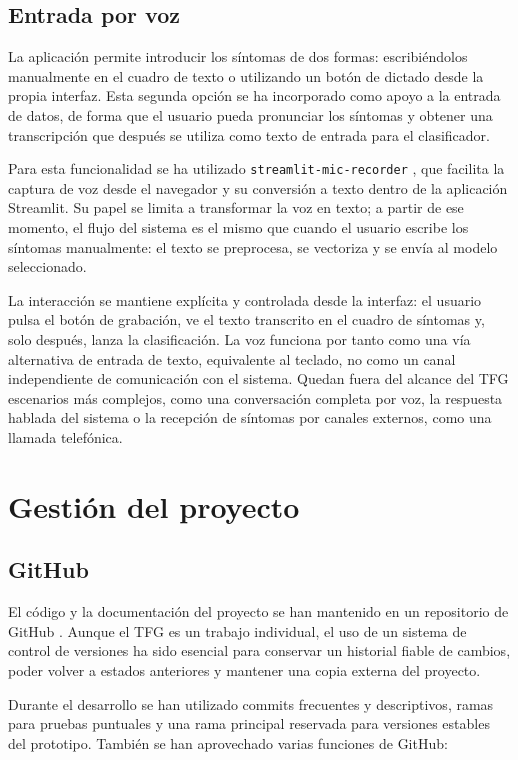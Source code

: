 \subsection{Entrada por voz}

La aplicación permite introducir los síntomas de dos formas: escribiéndolos manualmente en el cuadro de texto o utilizando un botón de dictado desde la propia interfaz. Esta segunda opción se ha incorporado como apoyo a la entrada de datos, de forma que el usuario pueda pronunciar los síntomas y obtener una transcripción que después se utiliza como texto de entrada para el clasificador.

Para esta funcionalidad se ha utilizado \texttt{streamlit-mic-recorder} \cite{streamlit_mic_recorder}, que facilita la captura de voz desde el navegador y su conversión a texto dentro de la aplicación Streamlit. Su papel se limita a transformar la voz en texto; a partir de ese momento, el flujo del sistema es el mismo que cuando el usuario escribe los síntomas manualmente: el texto se preprocesa, se vectoriza y se envía al modelo seleccionado.

La interacción se mantiene explícita y controlada desde la interfaz: el usuario pulsa el botón de grabación, ve el texto transcrito en el cuadro de síntomas y, solo después, lanza la clasificación. La voz funciona por tanto como una vía alternativa de entrada de texto, equivalente al teclado, no como un canal independiente de comunicación con el sistema. Quedan fuera del alcance del TFG escenarios más complejos, como una conversación completa por voz, la respuesta hablada del sistema o la recepción de síntomas por canales externos, como una llamada telefónica.

\section{Gestión del proyecto}

\subsection{GitHub}

El código y la documentación del proyecto se han mantenido en un repositorio de GitHub \cite{github_official}. Aunque el TFG es un trabajo individual, el uso de un sistema de control de versiones ha sido esencial para conservar un historial fiable de cambios, poder volver a estados anteriores y mantener una copia externa del proyecto.

Durante el desarrollo se han utilizado commits frecuentes y descriptivos, ramas para pruebas puntuales y una rama principal reservada para versiones estables del prototipo. También se han aprovechado varias funciones de GitHub:

